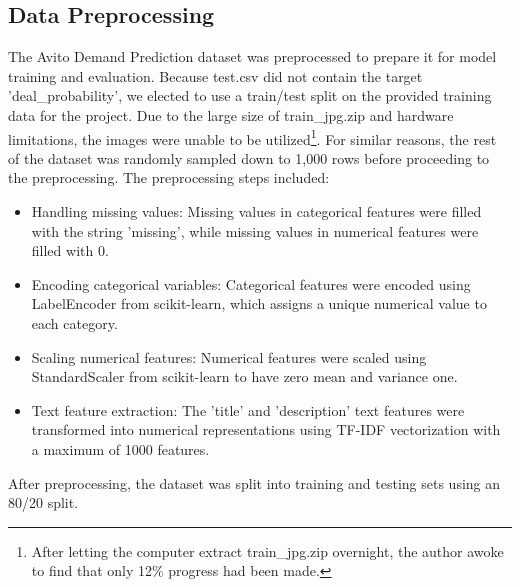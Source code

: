 \documentclass{article}
\begin{document}
\subsection{Data Preprocessing}
The Avito Demand Prediction dataset was preprocessed to prepare it for model training and evaluation. Because test.csv did not contain the target 'deal\_probability', we elected to use a train/test split on the provided training data for the project. Due to the large size of train\_jpg.zip and hardware limitations, the images were unable to be utilized\footnote{After letting the computer extract train\_jpg.zip overnight, the author awoke to find that only 12\% progress had been made.}. For similar reasons, the rest of the dataset was randomly sampled down to 1,000 rows before proceeding to the preprocessing. The preprocessing steps included:
\begin{itemize}
\item Handling missing values: Missing values in categorical features were filled with the string 'missing', while missing values in numerical features were filled with 0.
\item Encoding categorical variables: Categorical features were encoded using LabelEncoder from scikit-learn, which assigns a unique numerical value to each category.
\item Scaling numerical features: Numerical features were scaled using StandardScaler from scikit-learn to have zero mean and variance one.
\item Text feature extraction: The 'title' and 'description' text features were transformed into numerical representations using TF-IDF vectorization with a maximum of 1000 features.
\end{itemize}
After preprocessing, the dataset was split into training and testing sets using an 80/20 split.
\end{document}
